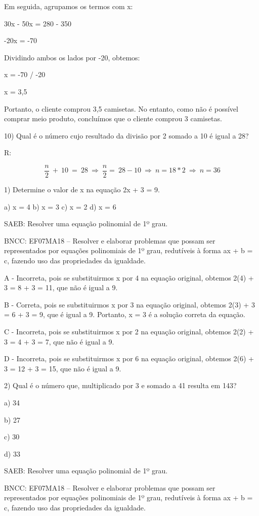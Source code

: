Em seguida, agrupamos os termos com x:

30x - 50x = 280 - 350

-20x = -70

Dividindo ambos os lados por -20, obtemos:

x = -70 / -20

x = 3,5

Portanto, o cliente comprou 3,5 camisetas. No entanto, como não é
possível comprar meio produto, concluímos que o cliente comprou 3
camisetas.

10) Qual é o número cujo resultado da divisão por 2 somado a 10 é igual
a 28?

R:

\[\ \frac{n}{2}\  + \ 10\  = \ 28\  \Rightarrow \ \frac{n}{2} = \ 28 - 10\  \Rightarrow \ n = 18*2\  \Rightarrow \ n = 36\]


1) Determine o valor de x na equação 2x + 3 = 9.

a) x = 4 b) x = 3 c) x = 2 d) x = 6

SAEB: Resolver uma equação polinomial de 1º grau.

BNCC: EF07MA18 -- Resolver e elaborar problemas que possam ser
representados por equações polinomiais de 1º grau, redutíveis à forma ax
+ b = c, fazendo uso das propriedades da igualdade.

A - Incorreta, pois se substituirmos x por 4 na equação original,
obtemos 2(4) + 3 = 8 + 3 = 11, que não é igual a 9.

B - Correta, pois se substituirmos x por 3 na equação original, obtemos
2(3) + 3 = 6 + 3 = 9, que é igual a 9. Portanto, x = 3 é a solução
correta da equação.

C - Incorreta, pois se substituirmos x por 2 na equação original,
obtemos 2(2) + 3 = 4 + 3 = 7, que não é igual a 9.

D - Incorreta, pois se substituirmos x por 6 na equação original,
obtemos 2(6) + 3 = 12 + 3 = 15, que não é igual a 9.

2) Qual é o número que, multiplicado por 3 e somado a 41 resulta em 143?

a) 34

b) 27

c) 30

d) 33

SAEB: Resolver uma equação polinomial de 1º grau.

BNCC: EF07MA18 -- Resolver e elaborar problemas que possam ser
representados por equações polinomiais de 1º grau, redutíveis à forma ax
+ b = c, fazendo uso das propriedades da igualdade.

